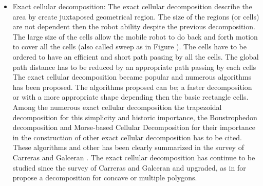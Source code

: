 \begin{itemize}
	\item Exact cellular decomposition: 
	The exact cellular decomposition describe the area by create juxtaposed geometrical region. The size of the regions (or cells) are not dependent then the robot ability despite the previous decomposition. The large size of the cells allow the  mobile robot to do back and forth motion to cover all the cells (also called sweep as in Figure ).  The cells have to be ordered to have an efficient and short path passing by all the cells. 
The global path distance has to be reduced by an appropriate path passing by each cells	
	The exact cellular decomposition became popular and numerous algorithms has been proposed. The algorithms proposed  can be; a faster decomposition or with a more appropriate shape depending then the basic rectangle cells. 
	Among the numerous exact cellular decomposition the trapezoidal decomposition for this simplicity and historic importance, the Boustrophedon decomposition  and  Morse-based Cellular Decomposition for their importance in the construction of other exact cellular decomposition has to be cited. These algorithms and other has been clearly summarized in the survey of Carreras and Galceran \citep{66*galceran2013}. 
	The exact cellular decomposition has continue to be studied since the survey of  Carreras and Galceran  \citep{66*galceran2013} and upgraded, as in \cite{144*torres2016} for propose a decomposition for concave or multiple polygons.
	
\end{itemize}




% 

 
